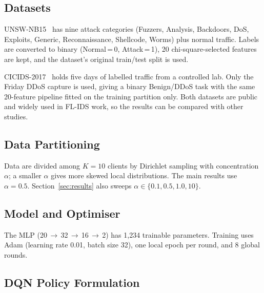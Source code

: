 \documentclass[iicol,Numbered]{sn-jnl}
\begin{document}
\subsection{Datasets}

UNSW-NB15~\cite{moustafa2015unsw} has nine attack categories (Fuzzers,
Analysis, Backdoors, DoS, Exploits, Generic, Reconnaissance, Shellcode, Worms)
plus normal traffic. Labels are converted to binary (Normal\,=\,0, Attack\,=\,1),
20 chi-square-selected features are kept, and the dataset's original train/test
split is used.

CICIDS-2017~\cite{sharafaldin2018cicids} holds five days of labelled traffic
from a controlled lab. Only the Friday DDoS capture is used, giving a binary
Benign/DDoS task with the same 20-feature pipeline fitted on the training
partition only. Both datasets are public and widely used in FL-IDS work, so the
results can be compared with other studies.

\subsection{Data Partitioning}

Data are divided among $K=10$ clients by Dirichlet sampling with concentration
$\alpha$; a smaller $\alpha$ gives more skewed local distributions. The main
results use $\alpha=0.5$. Section~\ref{sec:results} also sweeps
$\alpha\in\{0.1,0.5,1.0,10\}$.

\subsection{Model and Optimiser}

The MLP (20\,$\to$\,32\,$\to$\,16\,$\to$\,2) has 1,234 trainable parameters.
Training uses Adam (learning rate 0.01, batch size 32), one local epoch per
round, and 8 global rounds.

\subsection{DQN Policy Formulation}
\end{document}
